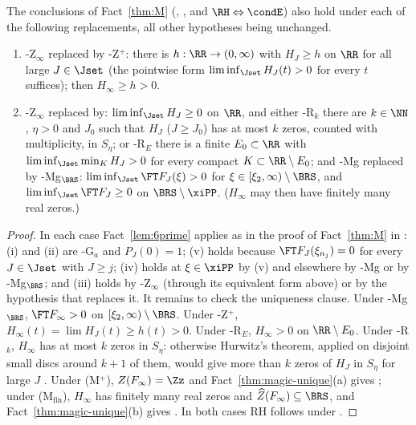 \begin{corollary}\label{cor:Mvariants}
The conclusions of Fact~\ref{thm:M} (\condS, \condU, and $\RH\Leftrightarrow\condE$) also hold under each of the following
replacements, all other hypotheses being unchanged.
\begin{enumerate}[label=(M\arabic*),leftmargin=3em]
\item[(M$^+$)] \hyp{Z$_\infty$} replaced by \hyp{Z$^+$}: there is $h:\RR\to(0,\infty)$ with $H_J\ge h$ on $\RR$ for all large
$J\in\Jset$ (the pointwise form $\liminf_{\Jset}H_J(t)>0$ for every $t$ suffices); then $H_\infty\ge h>0$.
\item[(M$_{\mathrm{fin}}$)] \hyp{Z$_\infty$} replaced by: $\liminf_{\Jset}H_J\ge0$ on $\RR$, and either \hyp{R$_k$} there are
$k\in\NN$, $\eta>0$ and $J_0$ such that $H_J$ ($J\ge J_0$) has at most $k$ zeros, counted with multiplicity, in
$S_\eta$; or \hyp{R$_E$} there is a finite $E_0\subset\RR$ with $\liminf_{\Jset}\min_KH_J>0$ for every compact
$K\subset\RR\setminus E_0$; and \hyp{Mg} replaced by \hyp{Mg$_{\BRS}$}: $\liminf_{\Jset}\FT F_J(\xi)>0$ for $\xi\in[\xi_2,\infty)\setminus\BRS$, and
$\liminf_{\Jset}\FT F_J\ge0$ on $\BRS\setminus\xiPP$. ($H_\infty$ may then have finitely many real zeros.)
\end{enumerate}
\end{corollary}

\begin{proof}
In each case Fact~\ref{lem:6prime} applies as in the proof of Fact~\ref{thm:M} in \cite{PaperI}: (i) and (ii) are \hyp{G$_a$} and
$P_J(0)=1$; (v) holds because $\FT F_J(\xi_{n_j})=0$ for every $J\in\Jset$ with $J\ge j$; (iv) holds at $\xi\in\xiPP$ by (v) and
elsewhere by \hyp{Mg} or by \hyp{Mg$_{\BRS}$}; and (iii) holds by \hyp{Z$_\infty$} (through its equivalent form above) or by the
hypothesis that replaces it. It remains to check the uniqueness clause. Under \hyp{Mg$_{\BRS}$}, $\FT F_\infty>0$ on $[\xi_2,\infty)\setminus\BRS$. Under \hyp{Z$^+$},
$H_\infty(t)=\lim H_J(t)\ge h(t)>0$. Under \hyp{R$_E$}, $H_\infty>0$ on $\RR\setminus E_0$. Under \hyp{R$_k$}, $H_\infty$ has
at most $k$ zeros in $S_\eta$: otherwise Hurwitz's theorem, applied on disjoint small discs around $k+1$ of them,
would give more than $k$ zeros of $H_J$ in $S_\eta$ for large $J$ \cite[VII.2.5]{Con73}. Under (M$^+$), $Z(F_\infty)=\Zz$ and
Fact~\ref{thm:magic-unique}(a) gives \condU; under (M$_{\mathrm{fin}}$), $H_\infty$ has finitely many real zeros and
$\widehat Z(F_\infty)\subseteq\BRS$, and Fact~\ref{thm:magic-unique}(b) gives \condU. In both cases RH follows under \condE.
\end{proof}

